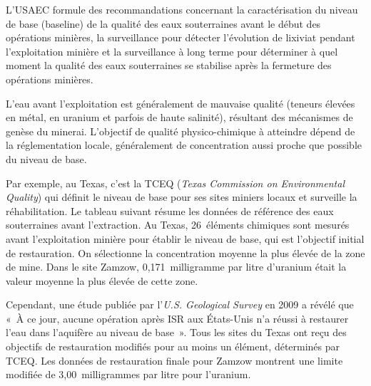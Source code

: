 \documentclass{article}
\begin{document}
L'USAEC formule des recommandations concernant la caractérisation du niveau de base (baseline) de la qualité des eaux souterraines avant le début des opérations minières, la surveillance pour détecter l’évolution de lixiviat pendant l'exploitation minière et la surveillance à long terme pour déterminer à quel moment la qualité des eaux souterraines se stabilise après la fermeture des opérations minières.

L'eau avant l'exploitation est généralement de mauvaise qualité (teneurs élevées en métal, en uranium et parfois de haute salinité), résultant des mécanismes de genèse du minerai. L'objectif de qualité physico-chimique à atteindre dépend de la réglementation locale, généralement de concentration aussi proche que possible du niveau de base.

Par exemple, au Texas, c’est la TCEQ (\textit{Texas Commission on Environmental Quality}) qui définit le niveau de base pour ses sites miniers locaux et surveille la réhabilitation. Le tableau suivant résume les données de référence des eaux souterraines avant l'extraction. Au Texas, 26~éléments chimiques sont mesurés avant l'exploitation minière pour établir le niveau de base, qui est l’objectif initial de restauration. On sélectionne la concentration moyenne la plus élevée de la zone de mine. Dans le site Zamzow, 0,171~milligramme par litre d'uranium était la valeur moyenne la plus élevée de cette zone.


Cependant, une étude publiée par l'\textit{U.S. Geological Survey} en 2009 a révélé que « À ce jour, aucune opération après ISR aux États-Unis n'a réussi à restaurer l'eau dans l'aquifère au niveau de base ». Tous les sites du Texas ont reçu des objectifs de restauration modifiés pour au moins un élément, déterminés par TCEQ. Les données de restauration finale pour Zamzow montrent une limite modifiée de 3,00~milligrammes par litre pour l'uranium. 


\end{document}
